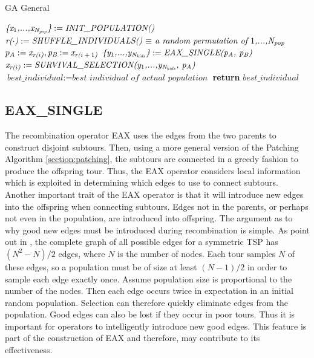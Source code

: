 \begin{algorithm}
\caption{GA General}\label{alg:gagen}
\begin{algorithmic}[1]
\State $\textit{\{x\textsubscript{$1$},...,x\textsubscript{N\textsubscript{pop}}\}} := \textit{INIT\_POPULATION()}$
	\State $\textit{r($\cdot$)} := \textit{SHUFFLE\_INDIVIDUALS() $\equiv$ a random permutation of $1$,...,N\textsubscript{pop} } $
		\State $p_A := \textit{x\textsubscript{r($i$)}} , \textit{p\textsubscript{B}} := \textit{x\textsubscript{r($i+1$)}} $
		\State $\textit{\{y\textsubscript{$1$},...,y\textsubscript{N\textsubscript{kids}}\}} := \textit{EAX\_SINGLE(p\textsubscript{A}, p\textsubscript{B})}$
		\State $\textit{x\textsubscript{r($i$)}} := \textit{SURVIVAL\_SELECTION(y\textsubscript{$1$},...,y\textsubscript{N\textsubscript{kids}}, p\textsubscript{A})} $
	\EndFor
	\State $\textit{best\_individual} := \textit{best individual of actual population}$
\EndWhile
\State \textbf{return} $best\_individual$
\EndProcedure
\end{algorithmic}
\end{algorithm}

\subsection{EAX\_SINGLE}
The recombination operator EAX uses the edges from the two parents to construct disjoint subtours.
Then, using a more general version of the Patching Algorithm \ref{section:patching}, the subtours are connected in a greedy fashion to produce the offspring tour. Thus, the EAX operator considers local information which is exploited in determining which edges to use to connect subtours.\\
Another important trait of the EAX operator is that it will introduce new edges into the offspring when connecting subtours. Edges not in the parents, or perhaps not even in the population, are introduced into offspring. 
The argument as to why good new edges must be introduced during recombination is simple. As point out in \cite{Mathias92geneticoperators}, the complete graph of all possible edges for a symmetric TSP has $(N^2-N)/2$ edges, where $N$ is the number of nodes. Each tour samples $N$ of these edges, so a population must be of size at least $(N-1)/2$ in order to sample each edge exactly once. Assume population size is proportional to the number of the nodes. Then each edge occurs twice in expectation in an initial random population. Selection can therefore quickly eliminate edges from the population. Good edges can also be lost if they occur in poor tours. Thus it is important for operators to intelligently introduce new good edges. This feature is part of the construction of EAX and therefore, may contribute to its effectiveness.\\

